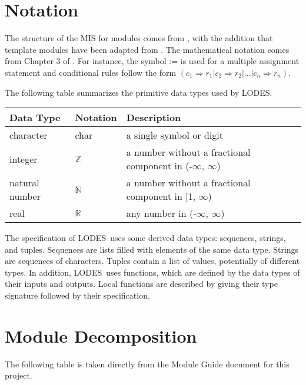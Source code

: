 \documentclass[12pt, titlepage]{article}
\newcommand{\progname}{LODES}
\begin{document}
\section{Notation}


The structure of the MIS for modules comes from \citet{HoffmanAndStrooper1995},
with the addition that template modules have been adapted from
\cite{GhezziEtAl2003}.  The mathematical notation comes from Chapter 3 of
\citet{HoffmanAndStrooper1995}.  For instance, the symbol := is used for a
multiple assignment statement and conditional rules follow the form $(c_1
\Rightarrow r_1 | c_2 \Rightarrow r_2 | ... | c_n \Rightarrow r_n )$.

The following table summarizes the primitive data types used by \progname. 

\begin{center}
\renewcommand{\arraystretch}{1.2}
\noindent 
\begin{tabular}{l l p{7.5cm}} 
\toprule 
\textbf{Data Type} & \textbf{Notation} & \textbf{Description}\\ 
\midrule
character & char & a single symbol or digit\\
integer & $\mathbb{Z}$ & a number without a fractional component in (-$\infty$, $\infty$) \\
natural number & $\mathbb{N}$ & a number without a fractional component in [1, $\infty$) \\
real & $\mathbb{R}$ & any number in (-$\infty$, $\infty$)\\
\bottomrule
\end{tabular} 
\end{center}

\noindent
The specification of \progname \ uses some derived data types: sequences, strings, and
tuples. Sequences are lists filled with elements of the same data type. Strings
are sequences of characters. Tuples contain a list of values, potentially of
different types. In addition, \progname \ uses functions, which
are defined by the data types of their inputs and outputs. Local functions are
described by giving their type signature followed by their specification.

\section{Module Decomposition}

The following table is taken directly from the Module Guide document for this project.
\end{document}
